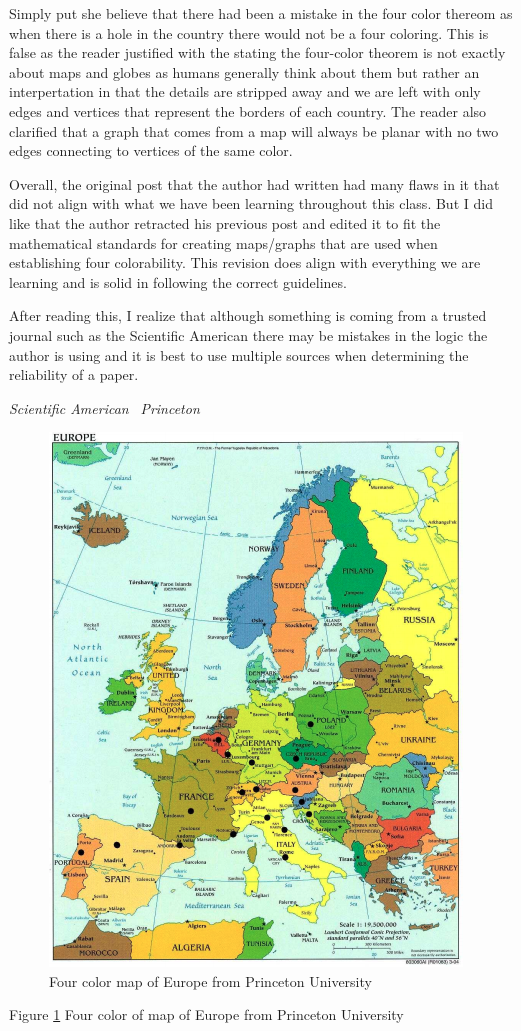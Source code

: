 \documentclass{article}
\begin{document}
Simply put she believe that there had been a mistake in the four color thereom as when there is a hole in the country there would not be 
a four coloring. This is false as the reader justified with the stating the four-color theorem is not exactly about maps and globes as 
humans generally think about them but rather an interpertation in that the details are stripped away and we are left with only edges 
and vertices that represent the borders of each country. The reader also clarified that a graph that comes from a map will always be 
planar with no two edges connecting to vertices of the same color. 

Overall, the original post that the author had written had many flaws in it that did not align with what we have been learning throughout 
this class. But I did like that the author retracted his previous post and edited it to fit the mathematical standards for creating maps/graphs 
that are used when establishing four colorability. This revision does align with everything we are learning and is solid in following the correct 
guidelines. 

After reading this, I realize that although something is coming from a trusted journal such as the Scientific American there may be mistakes 
in the logic the author is using and it is best to use multiple sources when determining the reliability of a paper. 


\emph{Scientific American}~\cite{science}
\emph{Princeton}~\cite{princeton}

\begin{figure}
    \includegraphics[width=\linewidth]{colormap.png}
    \caption{Four color map of Europe from Princeton University}
    \label{fig:fourcolor}
  \end{figure}

Figure \ref{fig:fourcolor} Four color of map of Europe from Princeton University

\newpage


\end{document}
